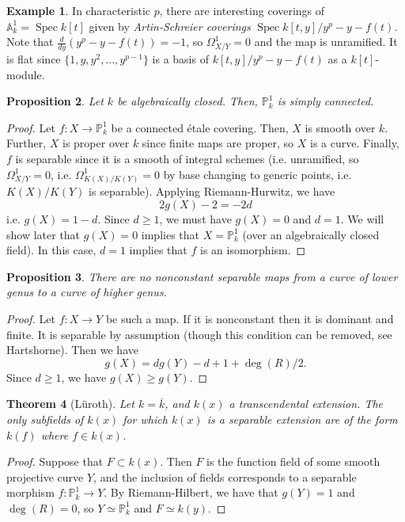 \documentclass[10pt]{article}
\newtheorem{thm}{Theorem}[section]
\newtheorem{prop}[thm]{Proposition}
\theoremstyle{definition}
\newtheorem{exmp}[thm]{Example}
\DeclareMathOperator{\Spec}{Spec}
\newcommand{\PP}{\mathbb{P}}
\begin{document}
\begin{exmp}
In characteristic $p$, there are interesting coverings of $\mathbb{A}^1_k = \Spec k[t]$ given by \emph{Artin-Schreier coverings} $\Spec k[t, y]/y^p - y - f(t)$.  Note that $\frac{d}{dy}(y^p - y - f(t)) = -1$, so $\Omega^1_{X/Y} = 0$ and the map is unramified.  It is flat since $\{1, y, y^2, \ldots, y^{p-1}\}$ is a basis of $k[t,y]/y^p - y - f(t)$ as a $k[t]$-module.
\end{exmp}

\begin{prop}
Let $k$ be algebraically closed.  Then, $\PP^1_k$ is simply connected.
\end{prop}
\begin{proof}
Let $f: X \rightarrow \PP^1_k$ be a connected \'{e}tale covering.  Then, $X$ is smooth over $k$.  Further, $X$ is proper over $k$ since finite maps are proper, so $X$ is a curve.  Finally, $f$ is separable since it is a smooth of integral schemes (i.e. unramified, so $\Omega^1_{X/Y} = 0$, i.e. $\Omega^1_{K(X)/K(Y)} = 0$ by base changing to generic points, i.e. $K(X)/K(Y)$ is separable).  Applying Riemann-Hurwitz, we have
$$2g(X) - 2 = -2d$$
i.e. $g(X) = 1 - d$.  Since $d \geq 1$, we must have $g(X) = 0$ and $d = 1$.  We will show later that $g(X) = 0$ implies that $X = \PP^1_k$ (over an algebraically closed field).  In this case, $d = 1$ implies that $f$ is an isomorphism.
\end{proof}



\begin{prop}
There are no nonconstant separable maps from a curve of lower genus to a curve of higher genus.
\end{prop}
\begin{proof}
Let $f: X \rightarrow Y$ be such a map.  If it is nonconstant then it is dominant and finite.  It is separable by assumption (though this condition can be removed, see Hartshorne).  Then we have
$$g(X) = d g(Y) - d + 1 + \deg(R)/2.$$
Since $d \geq 1$, we have $g(X) \geq g(Y)$.
\end{proof}



\begin{thm}[L\"{u}roth]
Let $k = \overline{k}$, and $k(x)$ a transcendental extension.  The only subfields of $k(x)$ for which $k(x)$ is a separable extension are of the form $k(f)$ where $f \in k(x)$.
\end{thm}
\begin{proof}
Suppose that $F \subset k(x)$.  Then $F$ is the function field of some smooth projective curve $Y$, and the inclusion of fields corresponds to a separable morphism $f: \PP^1_k \rightarrow Y$.  By Riemann-Hilbert, we have that $g(Y) = 1$ and $\deg(R) = 0$, so $Y \simeq \PP^1_k$ and $F \simeq k(y)$.
\end{proof}
\end{document}
